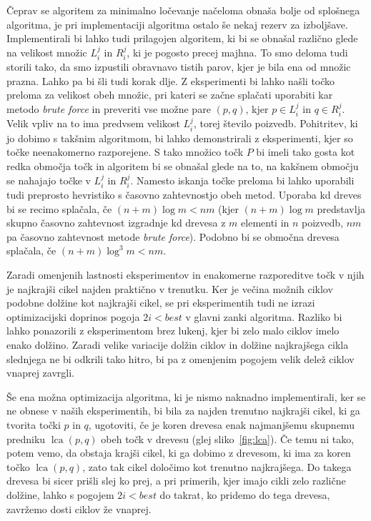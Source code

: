 \documentclass[a4paper, 12pt]{book}
\begin{document}
Čeprav se algoritem za minimalno ločevanje načeloma obnaša bolje od splo\-šne\-ga algoritma, je pri implementaciji algoritma ostalo še nekaj rezerv za izboljšave. Implementirali bi lahko tudi prilagojen algoritem, ki bi se obnašal različno glede na velikost množic $L_i^j$ in $R_i^j$, ki je pogosto precej majhna. To smo deloma tudi storili tako, da smo izpustili obravnavo  tistih parov, kjer je bila ena od množic prazna. Lahko pa bi šli tudi korak dlje. Z eksperimenti bi lahko našli točko preloma za velikost obeh množic, pri kateri se začne splačati uporabiti kar metodo \textit{brute force} in preveriti vse možne pare $(p,q)$, kjer $p\in L_i^j$ in $q\in R_i^j$. Velik vpliv na to ima predvsem velikost $L_i^j$, torej število poizvedb. Pohitritev, ki jo dobimo s takšnim algoritmom, bi lahko demonstrirali z eksperimenti, kjer so točke neenakomerno razporejene. S tako množico točk $P$ bi imeli tako gosta kot redka območja točk in algoritem bi se obnašal glede na to, na kakšnem območju se nahajajo točke v $L_i^j$ in $R_i^j$. Namesto iskanja točke preloma bi lahko uporabili tudi preprosto hevristiko s časovno zahtevnostjo obeh metod. Uporaba kd dreves bi se recimo splačala, če $(n+m)\log m < nm$ (kjer $(n+m)\log m$ predstavlja skupno časovno zahtevnost izgradnje kd drevesa z $m$ elementi in $n$ poizvedb, $nm$ pa časovno zahtevnost metode \textit{brute force}). Podobno bi se območna drevesa splačala, če $(n+m)\log^3 m < nm$.

Zaradi omenjenih lastnosti eksperimentov in enakomerne razporeditve točk v njih je najkrajši cikel najden praktično v trenutku. Ker je večina možnih ciklov podobne dolžine kot najkrajši cikel, se pri eksperimentih tudi ne izrazi optimizacijski doprinos pogoja $2i < best$ v glavni zanki algoritma. Razliko bi lahko ponazorili z eksperimentom brez lukenj, kjer bi zelo malo ciklov imelo enako dolžino. Zaradi velike variacije dolžin ciklov in dolžine najkrajšega cikla slednjega ne bi odkrili tako hitro, bi pa z omenjenim pogojem velik delež ciklov vnaprej zavrgli.

Še ena možna optimizacija algoritma, ki je nismo naknadno implementirali, ker se ne obnese v naših eksperimentih, bi bila za najden trenutno najkrajši cikel, ki ga tvorita točki $p$ in $q$, ugotoviti, če je koren drevesa enak najmanjšemu skupnemu predniku $\operatorname{lca}(p,q)$ obeh točk v drevesu (glej sliko~\ref{fig:lca}). Če temu ni tako, potem vemo, da obstaja krajši cikel, ki ga dobimo z drevesom, ki ima za koren točko $\operatorname{lca}(p,q)$, zato tak cikel določimo kot trenutno najkrajšega. Do takega drevesa bi sicer prišli slej ko prej, a pri primerih, kjer imajo cikli zelo različne dolžine, lahko s pogojem $2i < best$ do takrat, ko pridemo do tega drevesa, zavržemo dosti ciklov že vnaprej.
\end{document}
